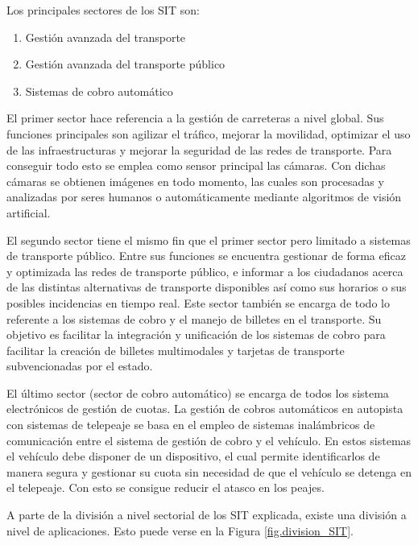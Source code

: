 Los principales sectores de los SIT son:
\begin{enumerate}
    \item Gestión avanzada del transporte
    \item Gestión avanzada del transporte público
    \item Sistemas de cobro automático
\end{enumerate}

El primer sector hace referencia a la gestión de carreteras a nivel global. Sus funciones principales son agilizar el tráfico, mejorar la movilidad, optimizar el uso de las infraestructuras y mejorar la seguridad de las redes de transporte. Para conseguir todo esto se emplea como sensor principal las cámaras. Con dichas cámaras se obtienen imágenes en todo momento, las cuales son procesadas y analizadas por seres humanos o automáticamente mediante algoritmos de visión artificial.  

El segundo sector tiene el mismo fin que el primer sector pero limitado a sistemas de transporte público. Entre sus funciones se encuentra gestionar de forma eficaz y optimizada las redes de transporte público, e informar  a los ciudadanos acerca de las distintas alternativas de transporte disponibles así como sus horarios o sus posibles incidencias en tiempo real. Este sector también se encarga de todo lo referente a los sistemas de cobro y el manejo de billetes en el transporte. Su objetivo es facilitar la integración y unificación de los sistemas de cobro para facilitar la creación de billetes multimodales y tarjetas de transporte subvencionadas por el estado.

El último sector (sector de cobro automático) se encarga de todos los sistema electrónicos de gestión de cuotas. La gestión de cobros automáticos en autopista con sistemas de telepeaje se basa en el empleo de sistemas inalámbricos de comunicación entre el sistema de gestión de cobro y el vehículo. En estos sistemas el vehículo debe disponer de un dispositivo, el cual permite identificarlos de manera segura y gestionar su cuota sin necesidad de que el vehículo se detenga en el telepeaje. Con esto se consigue reducir el atasco en los peajes.

A parte de la división a nivel sectorial de los SIT explicada, existe una división a nivel de aplicaciones. Esto puede verse en la Figura \ref{fig.division_SIT}.

